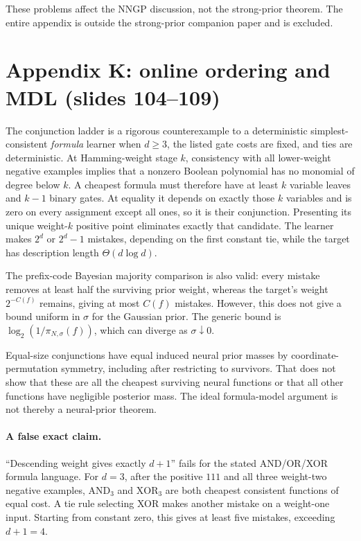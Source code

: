\documentclass[11pt]{article}
\begin{document}
These problems affect the NNGP discussion, not the strong-prior theorem. The entire appendix is outside the strong-prior companion paper and is excluded.

\section{Appendix K: online ordering and MDL (slides 104--109)}
The conjunction ladder is a rigorous counterexample to a deterministic simplest-consistent \emph{formula} learner when $d\geq3$, the listed gate costs are fixed, and ties are deterministic. At Hamming-weight stage $k$, consistency with all lower-weight negative examples implies that a nonzero Boolean polynomial has no monomial of degree below $k$. A cheapest formula must therefore have at least $k$ variable leaves and $k-1$ binary gates. At equality it depends on exactly those $k$ variables and is zero on every assignment except all ones, so it is their conjunction. Presenting its unique weight-$k$ positive point eliminates exactly that candidate. The learner makes $2^d$ or $2^d-1$ mistakes, depending on the first constant tie, while the target has description length $\Theta(d\log d)$.

The prefix-code Bayesian majority comparison is also valid: every mistake removes at least half the surviving prior weight, whereas the target's weight $2^{-C(f)}$ remains, giving at most $C(f)$ mistakes. However, this does not give a bound uniform in $\sigma$ for the Gaussian prior. The generic bound is $\log_2(1/\pi_{N,\sigma}(f))$, which can diverge as $\sigma\downarrow0$.

Equal-size conjunctions have equal induced neural prior masses by coordinate-permutation symmetry, including after restricting to survivors. That does not show that these are all the cheapest surviving neural functions or that all other functions have negligible posterior mass. The ideal formula-model argument is not thereby a neural-prior theorem.

\paragraph{A false exact claim.}
``Descending weight gives exactly $d+1$'' fails for the stated AND/OR/XOR formula language. For $d=3$, after the positive $111$ and all three weight-two negative examples, $\mathrm{AND}_3$ and $\mathrm{XOR}_3$ are both cheapest consistent functions of equal cost. A tie rule selecting XOR makes another mistake on a weight-one input. Starting from constant zero, this gives at least five mistakes, exceeding $d+1=4$.
\end{document}
